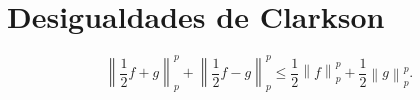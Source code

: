 \section{Desigualdades de Clarkson}

\begin{theorem}
    $$
        \left\| \frac{1}{2} f+g \right\|_p^p + \left\| \frac{1}{2} f-g \right\|_p^p \leq \frac{1}{2} \left\|f\right\|_p^p + \frac{1}{2}\left\|g\right\|_p^p.
    $$
\end{theorem}